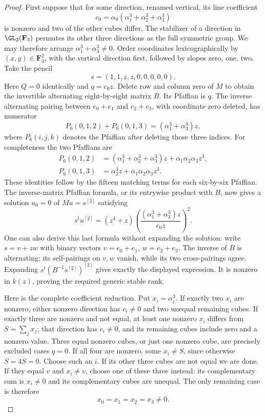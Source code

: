 \begin{proof}
First suppose that for some direction, renamed vertical, its line
coefficient
\[
          c_0=\alpha_0(\alpha_1^3+\alpha_2^3+\alpha_3^3)
\]
is nonzero and two of the other cubes differ. The stabilizer of a
direction in $\GL_2(\mathbf F_3)$ permutes its other three directions
as the full symmetric group. We may therefore arrange
$\alpha_1^3+\alpha_3^3\ne0$. Order coordinates lexicographically
by $(x,y)\in\mathbf F_3^2$, with the vertical direction first, followed
by slopes zero, one, two. Take the pencil
\[
                 s=(1,1,z,z,0,0,0,0,0).
\]
Here $Q=0$ identically and $q=c_0z$. Delete row and column zero of
$M$ to obtain the invertible alternating eight-by-eight matrix $B$.
Its Pfaffian is $q$. The inverse alternating pairing between
$e_0+e_1$ and $e_2+e_3$, with coordinate zero deleted, has numerator
\[
 P_6(0,1,2)+P_6(0,1,3)
                    =(\alpha_1^3+\alpha_3^3)z,
\]
where $P_6(i,j,k)$ denotes the Pfaffian after deleting those three
indices. For completeness the two Pfaffians are
\[
 \begin{split}
 P_6(0,1,2)&=(\alpha_1^3+\alpha_2^3+\alpha_3^3)z
                         +\alpha_1\alpha_2\alpha_3z^3,\\
 P_6(0,1,3)&=\alpha_2^3z+\alpha_1\alpha_2\alpha_3z^3.
 \end{split}
\]
These identities follow by the fifteen matching terms for each
six-by-six Pfaffian. The inverse-matrix Pfaffian formula, or its
entrywise product with $B$, now gives a solution $u_0=0$ of
$Mu=s^{[2]}$ satisfying
\[
 s^t u^{[2]}=(z^4+z)
       \left(\frac{(\alpha_1^3+\alpha_3^3)z}{c_0z}\right)^2.
\]
One can also derive this last formula without expanding the solution:
write $s=v+zw$ with binary vectors $v=e_0+e_1$, $w=e_2+e_3$.
The inverse of $B$ is alternating; its self-pairings on $v,w$ vanish,
while its two cross-pairings agree. Expanding
$s^t(B^{-1}s^{[2]})^{[2]}$ gives exactly the displayed expression.
It is nonzero in $k(z)$, proving the required generic stable rank.

Here is the complete coefficient reduction. Put $x_i=\alpha_i^3$.
If exactly two $x_i$ are nonzero, either nonzero direction has
$c_i\ne0$ and two unequal remaining cubes. If exactly three are
nonzero and not equal, at least one nonzero $x_i$ differs from
$S=\sum_jx_j$; that direction has $c_i\ne0$, and its remaining
cubes include zero and a nonzero value. Three equal nonzero cubes,
or just one nonzero cube, are precisely excluded cases $q=0$.
If all four are nonzero, some $x_i\ne S$, since otherwise $S=4S=0$.
Choose such an $i$. If its other three cubes are not equal we are
done. If they equal $v$ and $x_i\ne v$, choose one of these three
instead: its complementary sum is $x_i\ne0$ and its complementary
cubes are unequal. The only remaining case is therefore
\[
                         x_0=x_1=x_2=x_3\ne0.
\]


\end{proof}

